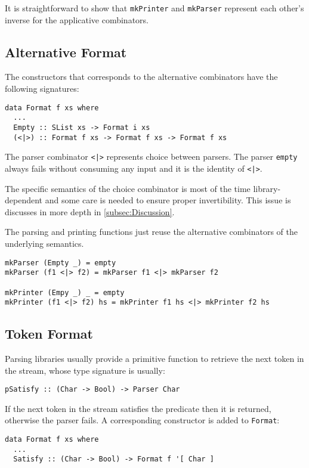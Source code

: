 \documentclass[../Thesis.tex]{subfiles}
\begin{document}
It is straightforward to show that \texttt{mkPrinter} and \texttt{mkParser} represent each other's inverse for the applicative combinators.

\subsection{Alternative Format}
The constructors that corresponds to the alternative combinators 
have the following signatures:

\begin{verbatim}
data Format f xs where
  ...
  Empty :: SList xs -> Format i xs
  (<|>) :: Format f xs -> Format f xs -> Format f xs
\end{verbatim}

The parser combinator \texttt{<|>} represents choice between parsers.
The parser \texttt{empty} always fails without consuming any input and it is 
the identity of \texttt{<|>}.

The specific semantics of the choice combinator is most of the time library-dependent and some care is needed to ensure proper invertibility. 
This issue is discusses in more depth in \ref{subsec:Discussion}.

The parsing and printing functions just reuse the alternative combinators
of the underlying semantics.

\begin{verbatim}
mkParser (Empty _) = empty
mkParser (f1 <|> f2) = mkParser f1 <|> mkParser f2

mkPrinter (Empy _) _ = empty
mkPrinter (f1 <|> f2) hs = mkPrinter f1 hs <|> mkPrinter f2 hs
\end{verbatim}

\subsection{Token Format}
Parsing libraries usually provide a primitive function to retrieve the next token in the stream, whose type signature is usually:
\begin{verbatim}
pSatisfy :: (Char -> Bool) -> Parser Char
\end{verbatim}

If the next token in the stream satisfies the predicate then it is returned, otherwise the parser fails.
A corresponding constructor is added to \texttt{Format}:

\begin{verbatim}
data Format f xs where
  ...
  Satisfy :: (Char -> Bool) -> Format f '[ Char ]
\end{verbatim}
\end{document}
